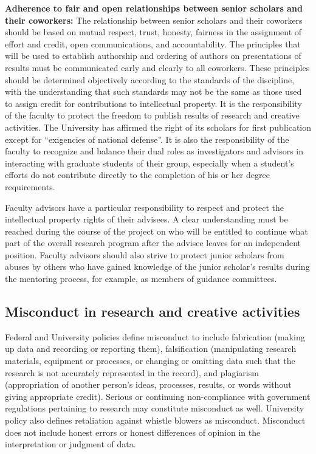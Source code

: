 \textbf{Adherence to fair and open relationships between senior
  scholars and their coworkers:} The relationship between senior
scholars and their coworkers should be based on mutual respect, trust,
honesty, fairness in the assignment of effort and credit, open
communications, and accountability. The principles that will be used
to establish authorship and ordering of authors on presentations of
results must be communicated early and clearly to all coworkers. These
principles should be determined objectively according to the standards
of the discipline, with the understanding that such standards may not
be the same as those used to assign credit for contributions to
intellectual property. It is the responsibility of the faculty to
protect the freedom to publish results of research and creative
activities. The University has affirmed the right of its scholars for
first publication except for “exigencies of national defense”. It is
also the responsibility of the faculty to recognize and balance their
dual roles as investigators and advisors in interacting with graduate
students of their group, especially when a student’s efforts do not
contribute directly to the completion of his or her degree
requirements. 

Faculty advisors have a particular responsibility to respect and
protect the intellectual property rights of their advisees. A clear
understanding must be reached during the course of the project on who
will be entitled to continue what part of the overall research program
after the advisee leaves for an independent position. Faculty advisors
should also strive to protect junior scholars from abuses by others
who have gained knowledge of the junior scholar’s results during the
mentoring process, for example, as members of guidance committees. 

\subsection{Misconduct in research and creative activities}

Federal and University policies define misconduct to include
fabrication (making up data and recording or reporting them),
falsification (manipulating research materials, equipment or
processes, or changing or omitting data such that the research is not
accurately represented in the record), and plagiarism (appropriation
of another person’s ideas, processes, results, or words without giving
appropriate credit). Serious or continuing non-compliance with
government regulations pertaining to research may constitute
misconduct as well. University policy also defines retaliation against
whistle blowers as misconduct. Misconduct does not include honest
errors or honest differences of opinion in the interpretation or
judgment of data. 

